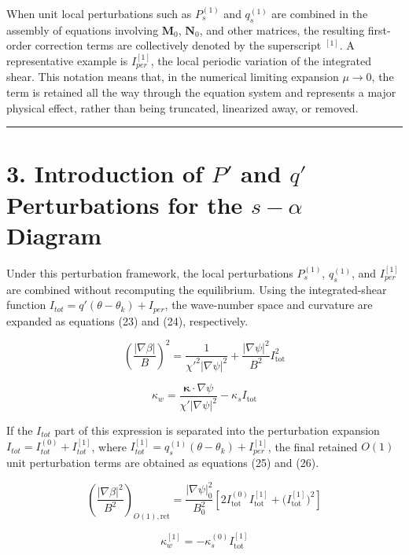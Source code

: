 \documentclass[11pt,a4paper]{article}
\begin{document}
When unit local perturbations such as \(P_s^{(1)}\) and \(q_s^{(1)}\) are combined
in the assembly of equations involving \(\mathbf{M}_0\), \(\mathbf{N}_0\), and other
matrices, the resulting first-order correction terms are collectively denoted by
the superscript \(^{[1]}\). A representative example is \(I_{per}^{[1]}\), the local
periodic variation of the integrated shear. This notation means that, in the
numerical limiting expansion \(\mu \to 0\), the term is retained all the way through
the equation system and represents a major physical effect, rather than being
truncated, linearized away, or removed.

\begin{center}\rule{0.5\linewidth}{0.5pt}\end{center}

\section{3. Introduction of \(P'\) and \(q'\) Perturbations for the \(s-\alpha\) Diagram}\label{introduction-of-pprime-and-qprime-perturbations-for-s-alpha-diagram}

Under this perturbation framework, the local perturbations \(P_s^{(1)}\),
\(q_s^{(1)}\), and \(I_{per}^{[1]}\) are combined without recomputing the
equilibrium. Using the integrated-shear function
\(I_{tot} = q'(\theta-\theta_k) + I_{per}\), the wave-number space and curvature are
expanded as equations (23) and (24), respectively.

\[ \left(\frac{|\nabla\beta|}{B}\right)^2 = \frac{1}{\chi'^2|\nabla\psi|^2} + \frac{|\nabla\psi|^2}{B^2}I_{\mathrm{tot}}^2 \tag{23} \]

\[ \kappa_w = \frac{\boldsymbol\kappa\cdot\nabla\psi}{\chi'|\nabla\psi|^2} - \kappa_s I_{\mathrm{tot}} \tag{24} \]

If the \(I_{tot}\) part of this expression is separated into the perturbation
expansion \(I_{tot} = I_{tot}^{(0)} + I_{tot}^{[1]}\), where
\(I_{tot}^{[1]} = q_s^{(1)}(\theta - \theta_k) + I_{per}^{[1]}\), the final retained
\(O(1)\) unit perturbation terms are obtained as equations (25) and (26).

\[ \left(\frac{|\nabla\beta|^2}{B^2}\right)_{O(1),\mathrm{ret}} = \frac{|\nabla\psi|_0^2}{B_0^2} \left[ 2I_{\mathrm{tot}}^{(0)}I_{\mathrm{tot}}^{[1]} + \bigl(I_{\mathrm{tot}}^{[1]}\bigr)^2 \right] \tag{25} \]

\[ \kappa_w^{[1]} = -\kappa_s^{(0)}I_{\mathrm{tot}}^{[1]} \tag{26} \]
\end{document}
